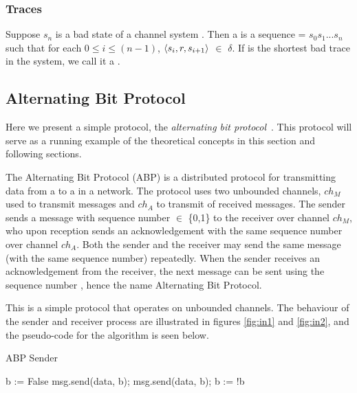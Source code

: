 \subsubsection{Traces}
\label{traces}
Suppose $s_n$ is a bad state of a channel system . Then a  is a sequence  = $s_0s_1...s_n$ such that for each $0 \leq i \leq (n-1)$, $\langle s_i,r,s_{i+1}\rangle$ $\in$ $\delta$. If  is the shortest bad trace in the system, we call it a .


\subsection{Alternating Bit Protocol}
Here we present a simple protocol, the \emph{alternating bit protocol}~\cite{bartlett1969note}. This protocol will serve as a running example of the theoretical concepts in this section and following sections.

The Alternating Bit Protocol (ABP) is a distributed protocol for transmitting data from a  to a  in a network. The protocol uses two unbounded channels, $ch_M$ used to transmit messages and $ch_A$ to transmit  of received messages. The sender sends a message with sequence number  $\in$ \{0,1\} to the receiver over channel $ch_M$, who upon reception sends an acknowledgement with the same sequence number over channel $ch_A$. Both the sender and the receiver may send the same message (with the same sequence number) repeatedly. When the sender receives an acknowledgement from the receiver, the next message can be sent using the sequence number , hence the name Alternating Bit Protocol.

This is a simple protocol that operates on unbounded channels. The behaviour of the sender and receiver process are illustrated in figures \ref{fig:in1} and \ref{fig:in2}, and the pseudo-code for the algorithm is seen below.

\begin{algorithm}
  \caption{ABP Sender}
  \label{senderpseudo}
\begin{algorithmic}[1]
    \State b := False 
      \State msg.send(data, b);
       
      \State msg.send(data, b); 
      \EndWhile
      \State b := !b 
    \EndFor
\end{algorithmic}
\end{algorithm}


